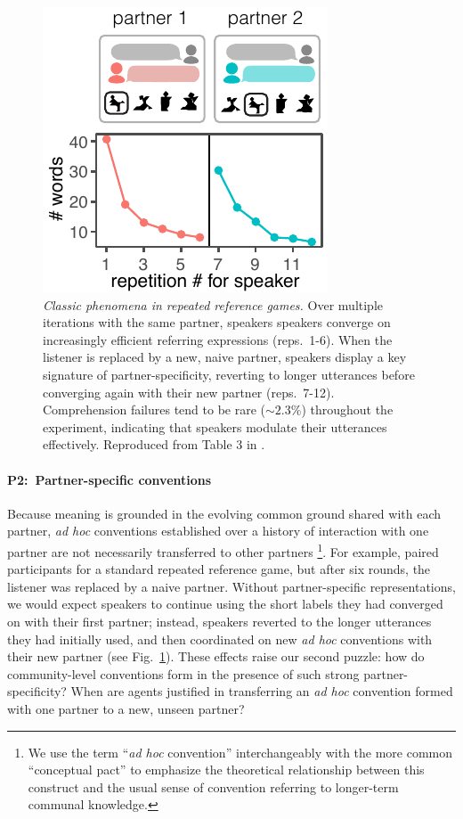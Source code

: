 \begin{figure}[t!]
\centering
\includegraphics[scale=1.3]{./figures/clark92_compressed}
\vspace{1em}
\caption{\textit{Classic phenomena in repeated reference games.} Over multiple iterations with the same partner, speakers speakers converge on increasingly efficient referring expressions (reps.~1-6). When the listener is replaced by a new, naive partner, speakers display a key signature of partner-specificity, reverting to longer utterances before converging again with their new partner (reps.~7-12). Comprehension failures tend to be rare ($\sim 2.3\%$) throughout the experiment, indicating that speakers modulate their utterances effectively. Reproduced from Table 3 in \protect{}.}
\label{fig:clark92}
\end{figure}

\paragraph{P2:~Partner-specific conventions}
Because meaning is grounded in the evolving common ground shared with each partner, \emph{ad hoc} conventions established over a history of interaction with one partner are not necessarily transferred to other partners \cite{metzing_when_2003,weber_cultural_2003,brown2009partner}\footnote{We use the term ``\emph{ad hoc} convention'' interchangeably with the more common ``conceptual pact''   \cite{BrennanClark96_ConceptualPactsConversation,IbarraTanenhaus16_FlexibilityConceptualPacts} to emphasize the theoretical relationship between this construct and the usual sense of convention referring to longer-term communal knowledge.}. 
For example,  paired participants for a standard repeated reference game, but after six rounds, the listener was replaced by a naive partner. 
Without partner-specific representations, we would expect speakers to continue using the short labels they had converged on with their first partner; instead, speakers reverted to the longer utterances they had initially used, and then coordinated on new \emph{ad hoc} conventions with their new partner (see Fig.~\ref{fig:clark92}).
These effects raise our second puzzle: how do community-level conventions form in the presence of such strong partner-specificity?
When are agents justified in transferring an \emph{ad hoc} convention formed with one partner to a new, unseen partner? 

